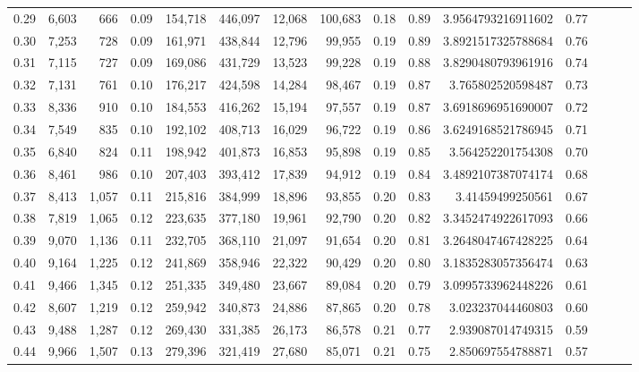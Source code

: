 \begin{tabular}{rrrrrrrrrrrrrrr}
0.29 &   6,603 &    666 &  0.09 &  154,718 &  446,097 &   12,068 &  100,683 &  0.18 &  0.89 &    3.9564793216911602 &      0.77 \\
0.30 &   7,253 &    728 &  0.09 &  161,971 &  438,844 &   12,796 &   99,955 &  0.19 &  0.89 &    3.8921517325788684 &      0.76 \\
0.31 &   7,115 &    727 &  0.09 &  169,086 &  431,729 &   13,523 &   99,228 &  0.19 &  0.88 &    3.8290480793961916 &      0.74 \\
0.32 &   7,131 &    761 &  0.10 &  176,217 &  424,598 &   14,284 &   98,467 &  0.19 &  0.87 &     3.765802520598487 &      0.73 \\
0.33 &   8,336 &    910 &  0.10 &  184,553 &  416,262 &   15,194 &   97,557 &  0.19 &  0.87 &    3.6918696951690007 &      0.72 \\
0.34 &   7,549 &    835 &  0.10 &  192,102 &  408,713 &   16,029 &   96,722 &  0.19 &  0.86 &    3.6249168521786945 &      0.71 \\
0.35 &   6,840 &    824 &  0.11 &  198,942 &  401,873 &   16,853 &   95,898 &  0.19 &  0.85 &     3.564252201754308 &      0.70 \\
0.36 &   8,461 &    986 &  0.10 &  207,403 &  393,412 &   17,839 &   94,912 &  0.19 &  0.84 &    3.4892107387074174 &      0.68 \\
0.37 &   8,413 &  1,057 &  0.11 &  215,816 &  384,999 &   18,896 &   93,855 &  0.20 &  0.83 &      3.41459499250561 &      0.67 \\
0.38 &   7,819 &  1,065 &  0.12 &  223,635 &  377,180 &   19,961 &   92,790 &  0.20 &  0.82 &    3.3452474922617093 &      0.66 \\
0.39 &   9,070 &  1,136 &  0.11 &  232,705 &  368,110 &   21,097 &   91,654 &  0.20 &  0.81 &    3.2648047467428225 &      0.64 \\
0.40 &   9,164 &  1,225 &  0.12 &  241,869 &  358,946 &   22,322 &   90,429 &  0.20 &  0.80 &    3.1835283057356474 &      0.63 \\
0.41 &   9,466 &  1,345 &  0.12 &  251,335 &  349,480 &   23,667 &   89,084 &  0.20 &  0.79 &    3.0995733962448226 &      0.61 \\
0.42 &   8,607 &  1,219 &  0.12 &  259,942 &  340,873 &   24,886 &   87,865 &  0.20 &  0.78 &     3.023237044460803 &      0.60 \\
0.43 &   9,488 &  1,287 &  0.12 &  269,430 &  331,385 &   26,173 &   86,578 &  0.21 &  0.77 &     2.939087014749315 &      0.59 \\
0.44 &   9,966 &  1,507 &  0.13 &  279,396 &  321,419 &   27,680 &   85,071 &  0.21 &  0.75 &     2.850697554788871 &      0.57 \\

\end{tabular}
